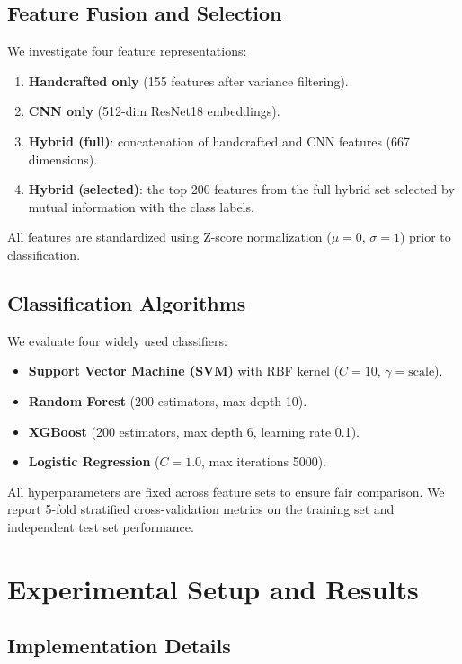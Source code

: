 \documentclass[conference]{IEEEtran}
\begin{document}
\subsection{Feature Fusion and Selection}

We investigate four feature representations:
\begin{enumerate}
    \item \textbf{Handcrafted only} (155 features after variance
          filtering).
    \item \textbf{CNN only} (512-dim ResNet18 embeddings).
    \item \textbf{Hybrid (full)}: concatenation of handcrafted and
          CNN features (667 dimensions).
    \item \textbf{Hybrid (selected)}: the top 200 features from the
          full hybrid set selected by mutual information with the
          class labels.
\end{enumerate}

All features are standardized using Z-score normalization
($\mu=0$, $\sigma=1$) prior to classification.

\subsection{Classification Algorithms}

We evaluate four widely used classifiers:
\begin{itemize}
    \item \textbf{Support Vector Machine (SVM)} with RBF kernel
          ($C=10$, $\gamma=\text{scale}$).
    \item \textbf{Random Forest} (200 estimators, max depth 10).
    \item \textbf{XGBoost} (200 estimators, max depth 6, learning
          rate 0.1).
    \item \textbf{Logistic Regression} ($C=1.0$, max iterations
          5000).
\end{itemize}

All hyperparameters are fixed across feature sets to ensure fair
comparison. We report 5-fold stratified cross-validation metrics on
the training set and independent test set performance.

\section{Experimental Setup and Results}
\label{sec:results}

\subsection{Implementation Details}
\end{document}
